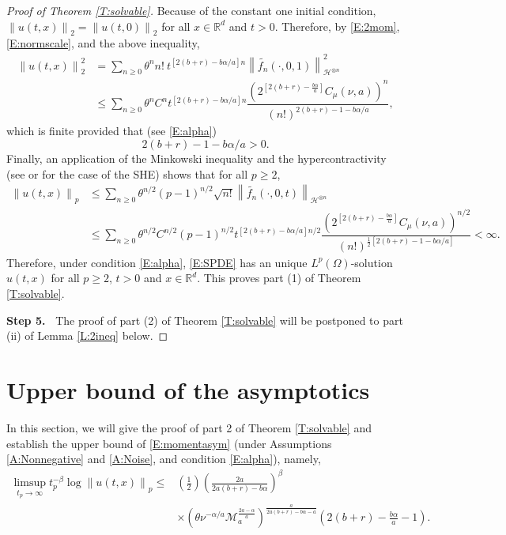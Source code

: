 \documentclass[12pt]{report}
\theoremstyle{plain}
\theoremstyle{definition}
\numberwithin{equation}{section}
\newcommand{\R}{\mathbb{R}}
\newcommand{\Norm}[1]{\left\|  #1   \right\|}
\begin{document}
\begin{proof}[Proof of Theorem \ref{T:solvable}]
	Because of the constant one initial condition, $\Norm{u(t,x)}_2 =\Norm{u(t,0)}_2$ for all $x \in
	\R^d$ and $t>0$. Therefore, by \eqref{E:2mom}, \eqref{E:normscale}, and the above inequality,
	\begin{align}
	\nonumber
	\Norm{u(t,x)}_2^2
	& = \sum_{n \ge 0} \theta^n n! \: t^{[2(b + r ) -b \alpha / a]n}  \Norm{ \widetilde{f_n}(\cdot,0,1) }_{ \mathcal{H}^{\otimes n} }^2 \\
	& \le \sum_{n \ge 0} \theta^n C^n t^{[2(b + r ) -b \alpha / a]n} \dfrac{ \left(2^{ \left[ 2(b+r)- \frac{b \alpha}{a} \right]}C_\mu(\nu, a) \right)^n }{ (n!)^{ 2(b+r) - 1 - b\alpha/a }},
	\label{E:2nomBd}
	\end{align}
	which is finite provided that (see \eqref{E:alpha})
	\begin{equation} \label{E:alpha4}
	2(b+r) - 1 - b\alpha/a > 0.
	\end{equation}
	Finally, an application of the Minkowski inequality and the hypercontractivity (see \cite[Theorem B.1]{balan.chen.ea:22:exact} or \cite{le:16:remark} for the case of the SHE) shows that for all $p\ge 2$,
	\begin{align}
	\nonumber
	\Norm{u(t,x)}_p
	& \le \sum_{n\ge 0} \theta^{n/2} (p-1)^{n/2} \sqrt{n!} \Norm{\widetilde{f_n}(\cdot,0,t) }_{ \mathcal{H}^{\otimes n} } \\
	& \le \sum_{n \ge 0} \theta^{n/2} C^{n/2} (p-1)^{n/2}  t^{[2(b + r ) -b \alpha /a]n/2}
	\dfrac{\left(2^{ \left[ 2(b+r)- \frac{b \alpha}{a} \right]}C_\mu(\nu, a) \right)^{n/2} }{ (n!)^{\frac{1}{2}\left[ 2(b+r) - 1 - b\alpha/a \right]}} < \infty.
	\label{E:pmomBd}
	\end{align}
	Therefore, under condition \eqref{E:alpha}, \eqref{E:SPDE} has an unique $L^p(\Omega)$-solution
	$u(t,x)$ for all $p\ge 2$, $t>0$ and $x\in\R^d$.  This proves part (1) of Theorem
	\ref{T:solvable}.%
	
	{\bigskip\bf\noindent Step 5.~}%
	The proof of part (2) of Theorem \ref{T:solvable} will be postponed to part (ii) of Lemma
	\ref{L:2ineq} below.%
\end{proof}

\section{Upper bound of the asymptotics} \label{S:upperbd}

In this section, we will give the proof of part 2 of Theorem \ref{T:solvable} and establish the
upper bound of \eqref{E:momentasym} (under Assumptions \ref{A:Nonnegative} and \ref{A:Noise}, and
condition \eqref{E:alpha}), namely,
\begin{equation} \label{E:momentasym-upper}
\begin{aligned}
\limsup_{t_p \to \infty} t_p^{-\beta} \log \Norm{u(t,x)}_p \le
& \left(\frac{1}{2}\right)\left(\frac{2a}{2a(b+r)- b\alpha} \right)^\beta \\
& \times \left(\theta\nu^{-\alpha/a} \mathcal{M}_a^{\frac{2a-\alpha}{a}}\right)^{\frac{a}{2a(b+r)-b\alpha-a}}\left(2(b+r)-\frac{b\alpha}{a}-1\right).
\end{aligned}
\end{equation}
\end{document}
